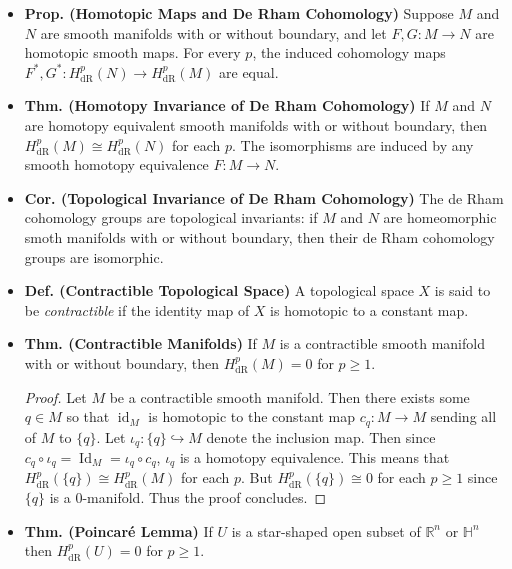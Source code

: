 \documentclass{article}
\newcommand{\embedd}{\hookrightarrow}
\begin{document}
\begin{itemize}
		\item \textbf{Prop. (Homotopic Maps and De Rham Cohomology)} Suppose $M$ and $N$ are smooth manifolds with or without boundary, and let $F, G: M \to N$ are homotopic smooth maps. For every $p$, the induced cohomology maps $F^{\ast}, G^{\ast}: H^{p}_{\text{dR}}(N) \to H^{p}_{\text{dR}}(M)$ are equal. 
		
		\item \textbf{Thm. (Homotopy Invariance of De Rham Cohomology)} If $M$ and $N$ are homotopy equivalent smooth manifolds with or without boundary, then $H^{p}_{\text{dR}}(M) \cong H^{p}_{\text{dR}}(N)$ for each $p$. The isomorphisms are induced by any smooth homotopy equivalence $F: M \to N$. 
		
		\item \textbf{Cor. (Topological Invariance of De Rham Cohomology)} The de Rham cohomology groups are topological invariants: if $M$ and $N$ are homeomorphic smoth manifolds with or without boundary, then their de Rham cohomology groups are isomorphic. 
		
		\item \textbf{Def. (Contractible Topological Space)} A topological space $X$ is said to be \textit{contractible} if the identity map of $X$ is homotopic to a constant map. 
		
		\item \textbf{Thm. (Contractible Manifolds)} If $M$ is a contractible smooth manifold with or without boundary, then $H^{p}_{\text{dR}}(M) = 0$ for $p \geq 1$. \vspace{-0.25cm}
		
		\begin{proof}
			Let $M$ be a contractible smooth manifold. Then there exists some $q \in M$ so that $\operatorname{id}_{M}$ is homotopic to the constant map $c_{q}: M \to M$ sending all of $M$ to $\{q\}$. Let $\iota_{q}: \{q\} \embedd M$ denote the inclusion map. Then since $c_{q} \circ \iota_{q} = \operatorname{Id}_{M} = \iota_{q} \circ c_{q}$, $\iota_{q}$ is a homotopy equivalence. This means that $H^{p}_{\text{dR}}(\{q\}) \cong H^{p}_{\text{dR}}(M)$ for each $p$. But $H^{p}_{\text{dR}}(\{q\}) \cong 0$ for each $p \geq 1$ since $\{q\}$ is a 0-manifold. Thus the proof concludes. 
		\end{proof}
		
		\item \textbf{Thm. (Poincar\'e Lemma)} If $U$ is a star-shaped open subset of $\mathbb{R}^{n}$ or $\mathbb{H}^{n}$ then $H^{p}_{\text{dR}}(U) = 0$ for $p\geq 1$. \vspace{-0.25cm}
		

\end{itemize}
\end{document}
